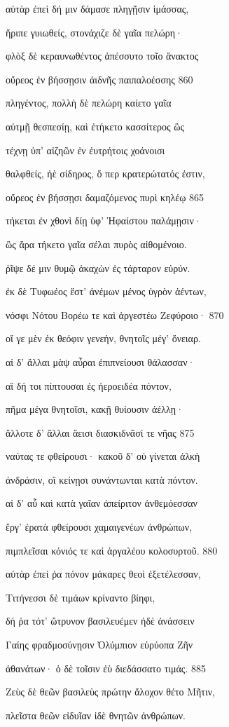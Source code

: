 αὐτὰρ ἐπεὶ δή μιν δάμασε πληγῇσιν ἱμάσσας,

ἤριπε γυιωθείς, στονάχιζε δὲ γαῖα πελώρη· 

φλὸξ δὲ κεραυνωθέντος ἀπέσσυτο τοῖο ἄνακτος

οὔρεος ἐν βήσσῃσιν ἀιδνῆς παιπαλοέσσης 860

πληγέντος, πολλὴ δὲ πελώρη καίετο γαῖα 

αὐτμῇ θεσπεσίῃ, καὶ ἐτήκετο κασσίτερος ὣς

τέχνῃ ὑπ' αἰζηῶν ἐν ἐυτρήτοις χοάνοισι

θαλφθείς, ἠὲ σίδηρος, ὅ περ κρατερώτατός ἐστιν, 

οὔρεος ἐν βήσσῃσι δαμαζόμενος πυρὶ κηλέῳ 865

τήκεται ἐν χθονὶ δίῃ ὑφ' Ἡφαίστου παλάμῃσιν· 

ὣς ἄρα τήκετο γαῖα σέλαι πυρὸς αἰθομένοιο.

ῥῖψε δέ μιν θυμῷ ἀκαχὼν ἐς τάρταρον εὐρύν. 

ἐκ δὲ Τυφωέος ἔστ' ἀνέμων μένος ὑγρὸν ἀέντων,

νόσφι Νότου Βορέω τε καὶ ἀργεστέω Ζεφύροιο· 870

οἵ γε μὲν ἐκ θεόφιν γενεήν, θνητοῖς μέγ' ὄνειαρ.

αἱ δ' ἄλλαι μὰψ αὖραι ἐπιπνείουσι θάλασσαν·

αἳ δή τοι πίπτουσαι ἐς ἠεροειδέα πόντον,

πῆμα μέγα θνητοῖσι, κακῇ θυίουσιν ἀέλλῃ· 

ἄλλοτε δ' ἄλλαι ἄεισι διασκιδνᾶσί τε νῆας 875

ναύτας τε φθείρουσι· κακοῦ δ' οὐ γίνεται ἀλκὴ 

ἀνδράσιν, οἳ κείνῃσι συνάντωνται κατὰ πόντον. 

αἱ δ' αὖ καὶ κατὰ γαῖαν ἀπείριτον ἀνθεμόεσσαν

ἔργ' ἐρατὰ φθείρουσι χαμαιγενέων ἀνθρώπων, 

πιμπλεῖσαι κόνιός τε καὶ ἀργαλέου κολοσυρτοῦ. 880

αὐτὰρ ἐπεί ῥα πόνον μάκαρες θεοὶ ἐξετέλεσσαν, 

Τιτήνεσσι δὲ τιμάων κρίναντο βίηφι,

δή ῥα τότ' ὤτρυνον βασιλευέμεν ἠδὲ ἀνάσσειν

Γαίης φραδμοσύνῃσιν Ὀλύμπιον εὐρύοπα Ζῆν

ἀθανάτων· ὁ δὲ τοῖσιν ἐὺ διεδάσσατο τιμάς. 885

Ζεὺς δὲ θεῶν βασιλεὺς πρώτην ἄλοχον θέτο Μῆτιν, 

πλεῖστα θεῶν εἰδυῖαν ἰδὲ θνητῶν ἀνθρώπων. 

